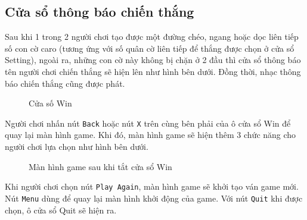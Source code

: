\subsection{Cửa sổ thông báo chiến thắng}
Sau khi 1 trong 2 người chơi tạo được một đường chéo, ngang hoặc dọc liên tiếp số con cờ caro (tương ứng với số quân cờ liên tiếp để thắng được chọn ở cửa sổ Setting), ngoài ra, những con cờ này không bị chặn ở 2 đầu thì cửa sổ thông báo tên người chơi chiến thắng sẽ hiện lên như hình bên dưới. Đồng thời, nhạc thông báo chiến thắng cũng được phát.
\begin{figure}[H]
  \caption{Cửa số Win}
\end{figure}
Người chơi nhấn nút \verb|Back| hoặc nút \verb|X| trên cùng bên phải của ô cửa sổ Win để quay lại màn hình game. Khi đó, màn hình game sẽ hiện thêm 3 chức năng cho người chơi lựa chọn như hình bên dưới.
\begin{figure}[H]
  \caption{Màn hình game sau khi tắt cửa sổ Win}
\end{figure}
Khi người chơi chọn nút \verb|Play Again|, màn hình game sẽ khởi tạo ván game mới. Nút \verb|Menu| dùng để quay lại màn hình khởi động của game. Với nút \verb|Quit| khi được chọn, ô cửa sổ Quit sẽ hiện ra.
